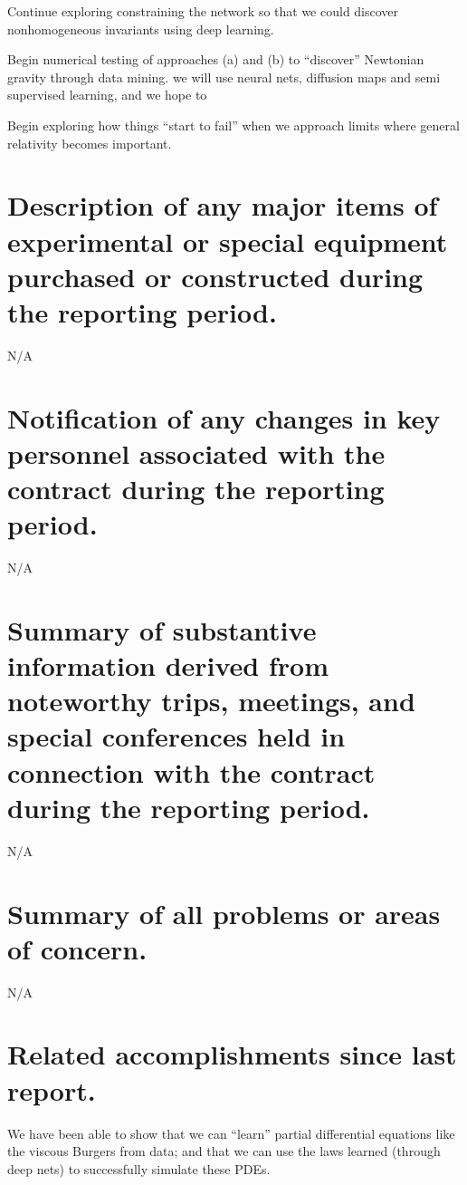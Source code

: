 \documentclass[11pt]{article}
\theoremstyle{plain}
\theoremstyle{remark}
\theoremstyle{definition}
\begin{document}
\begin{compactenum}
\item Continue exploring constraining the network so that we could discover nonhomogeneous invariants using deep learning.

\item Begin numerical testing of approaches (a) and (b) to ``discover'' Newtonian gravity through data mining. we will use neural nets, diffusion maps and semi supervised learning, and we hope to 

\item Begin exploring how things ``start to fail'' when we approach limits where general relativity becomes important.


\end{compactenum}



\section{Description of any major items of experimental or special equipment purchased or constructed during the reporting period.}

N/A

\section{Notification of any changes in key personnel associated with the contract during the reporting period.}

N/A

\section{Summary of substantive information derived from noteworthy trips, meetings, and special conferences held in connection with the contract during the reporting period.}

N/A

\section{Summary of all problems or areas of concern.}

N/A

\section{Related accomplishments since last report.}

We have been able to show that we can ``learn'' partial differential equations like the viscous Burgers from data; and that we can use the laws learned (through deep nets) to successfully simulate these PDEs. 





\end{document}
